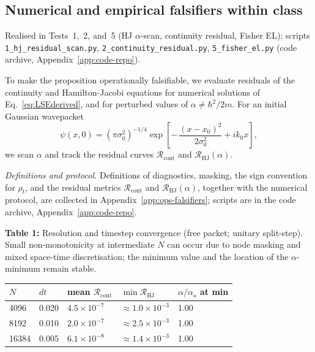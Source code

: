 \documentclass[11pt,a4paper]{article}
\numberwithin{equation}{section}
\theoremstyle{thmcompact}
\theoremstyle{remark}
\begin{document}
\subsection{Numerical and empirical falsifiers within class}

Realised in Tests~1,~2, and~5 (HJ $\alpha$-scan, continuity residual, Fisher EL); scripts \texttt{1\_hj\_residual\_scan.py}, \texttt{2\_continuity\_residual.py}, \texttt{5\_fisher\_el.py} (code archive, Appendix~\ref{app:code-repo}).

To make the proposition operationally falsifiable, we evaluate residuals of the continuity and Hamilton-Jacobi equations for numerical solutions of Eq.~\eqref{eq:LSEderived}, and for perturbed values of $\alpha \neq \hbar^2/2m$.
For an initial Gaussian wavepacket
\[
\psi(x,0) = (\pi\sigma_0^2)^{-1/4}
\exp\!\left[-\,\frac{(x - x_0)^2}{2\sigma_0^2} + i k_0 x\right],
\]
we scan $\alpha$ and track the residual curves $\mathcal{R}_{\mathrm{cont}}$ and $\mathcal{R}_{\mathrm{HJ}}(\alpha)$.

\medskip
\emph{Definitions and protocol.}
Definitions of diagnostics, masking, the sign convention for $\rho_t$, and the residual metrics $\mathcal{R}_{\mathrm{cont}}$ and $\mathcal{R}_{\mathrm{HJ}}(\alpha)$, together with the numerical protocol, are collected in Appendix~\ref{app:ops-falsifiers}; scripts are in the code archive, Appendix~\ref{app:code-repo}.

\vspace{5mm}

\textbf{Table 1:} Resolution and timestep convergence (free packet; unitary split-step). Small non-monotonicity at intermediate $N$ can occur due to node masking and mixed space-time discretisation; the minimum value and the location of the $\alpha$-minimum remain stable.
\begin{center}
	\begin{tabular}{@{}lllll@{}}
		\toprule
		$N$ & $dt$ & mean $\mathcal{R}_{\mathrm{cont}}$ & $\min \mathcal{R}_{\mathrm{HJ}}$ & $\alpha/\alpha_\star$ at min \\
		\midrule
		4096  & 0.020 & $4.5\times10^{-7}$ & $\approx 1.0\times10^{-3}$  & 1.00 \\
		8192  & 0.010 & $2.0\times10^{-7}$ & $\approx 2.5\times10^{-3}$  & 1.00 \\
		16384 & 0.005 & $6.1\times10^{-8}$ & $\approx 1.4\times10^{-3}$  & 1.00 \\
		\bottomrule
	\end{tabular}
\end{center}
\end{document}

